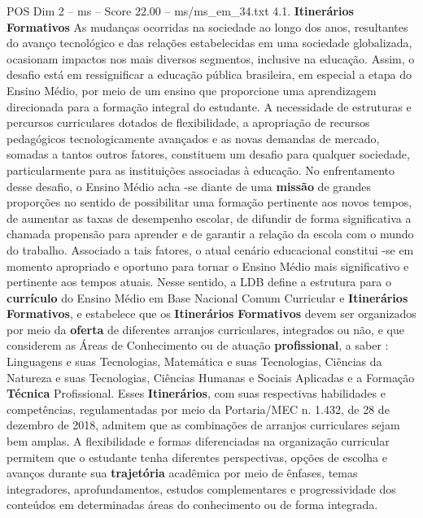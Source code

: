 \begin{textsample}{POS Dim 2 – ms – Score 22.00 – ms/ms\_em\_34.txt}  \label{ex:f2_pos_044}
4.1. \textbf{Itinerários} \textbf{Formativos} As mudanças ocorridas na sociedade ao longo dos anos, resultantes do avanço tecnológico e das relações estabelecidas em uma sociedade globalizada, ocasionam impactos nos mais diversos segmentos, inclusive na educação.
Assim, o desafio está em ressignificar a educação pública brasileira, em especial a etapa do Ensino Médio, por meio de um ensino que proporcione uma aprendizagem direcionada para a formação integral do estudante.
A necessidade de estruturas e percursos curriculares dotados de flexibilidade, a apropriação de recursos pedagógicos tecnologicamente avançados e as novas demandas de mercado, somadas a tantos outros fatores, constituem um desafio para qualquer sociedade, particularmente para as instituições associadas à educação.
No enfrentamento desse desafio, o Ensino Médio acha -se diante de uma \textbf{missão} de grandes proporções no sentido de possibilitar uma formação pertinente aos novos tempos, de aumentar as taxas de desempenho escolar, de difundir de forma significativa a chamada propensão para aprender e de garantir a relação da escola com o mundo do trabalho.
Associado a tais fatores, o atual cenário educacional constitui -se em momento apropriado e oportuno para tornar o Ensino Médio mais significativo e pertinente aos tempos atuais.
Nesse sentido, a LDB define a estrutura para o \textbf{currículo} do Ensino Médio em Base Nacional Comum Curricular e \textbf{Itinerários} \textbf{Formativos}, e estabelece que os \textbf{Itinerários} \textbf{Formativos} devem ser organizados por meio da \textbf{oferta} de diferentes arranjos curriculares, integrados ou não, e que considerem as Áreas de Conhecimento ou de atuação \textbf{profissional}, a saber : Linguagens e suas Tecnologias, Matemática e suas Tecnologias, Ciências da Natureza e suas Tecnologias, Ciências Humanas e Sociais Aplicadas e a Formação \textbf{Técnica} Profissional.
Esses \textbf{Itinerários}, com suas respectivas habilidades e competências, regulamentadas por meio da Portaria/MEC n. 1.432, de 28 de dezembro de 2018, admitem que as combinações de arranjos curriculares sejam bem amplas.
A flexibilidade e formas diferenciadas na organização curricular permitem que o estudante tenha diferentes perspectivas, opções de escolha e avanços durante sua \textbf{trajetória} acadêmica por meio de ênfases, temas integradores, aprofundamentos, estudos complementares e progressividade dos conteúdos em determinadas áreas do conhecimento ou de forma integrada.

\end{textsample}
